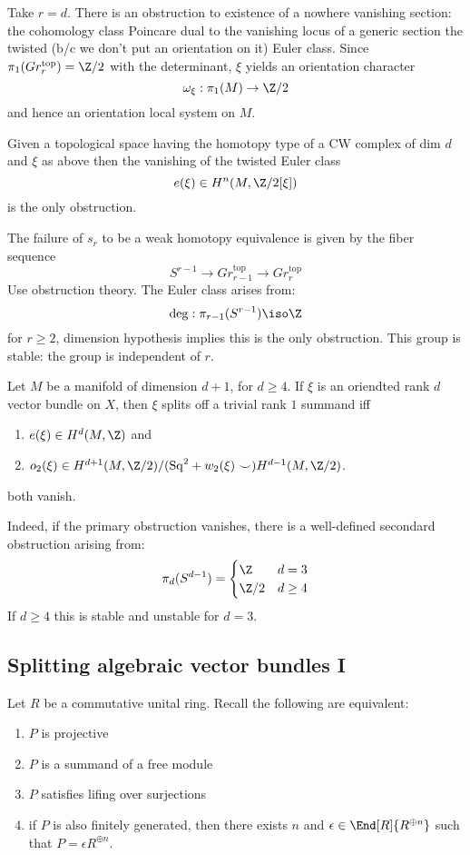 \documentclass{article}
\begin{document}
Take $r = d$. There is an obstruction to existence of a nowhere vanishing section: the cohomology class Poincare dual to the vanishing locus of a generic section the twisted (b/c we don't put an orientation on it) Euler class. Since $\pi_1(Gr_r^{\text{top}}) = \Z / 2$ with the determinant, $\xi$ yields an orientation character
\[ \omega_\xi : \pi_1(M) \to \Z / 2 \]
and hence an orientation local system on $M$.

\begin{theorem}
Given a topological space having the homotopy type of a CW complex of dim $d$ and $\xi$ as above then the vanishing of the twisted Euler class
\[ e(\xi) \in H^n(M, \Z/2[\xi]) \]
is the only obstruction. 
\end{theorem}

The failure of $s_r$ to be a weak homotopy equivalence is given by the fiber sequence
\[ S^{r-1} \to Gr_{r-1}^{\text{top}} \to Gr_{r}^{\text{top}} \] 
Use obstruction theory. The Euler class arises from:
\[ \deg : \pi_{r-1}(S^{r-1}) \iso \Z \]
for $r \ge 2$, dimension hypothesis implies this is the only obstruction. This group is stable: the group is independent of $r$. 

\begin{theorem}
Let $M$ be a manifold of dimension $d+1$, for $d \ge 4$. If $\xi$ is an oriendted rank $d$ vector bundle on $X$, then $\xi$ splits off a trivial rank $1$ summand iff 
\begin{enumerate}
\item $e(\xi) \in H^d(M, \Z)$ and
\item $o_2(\xi) \in H^{d+1}(M, \Z/2) / (\mathrm{Sq}^2 + w_2(\xi) \smile) H^{d-1}(M, \Z / 2)$. 
\end{enumerate}
both vanish.
\end{theorem}
Indeed, if the primary obstruction vanishes, there is a well-defined secondard obstruction arising from:
\[ \pi_d(S^{d-1}) = 
\begin{cases}
\Z & d = 3
\\
\Z / 2 & d \ge 4
\end{cases} \]
If $d \ge 4$ this is stable and unstable for $d = 3$. 

\subsection{Splitting algebraic vector bundles I}

Let $R$ be a commutative unital ring. Recall the following are equivalent:
\begin{enumerate}
\item $P$ is projective
\item $P$ is a summand of a free module
\item $P$ satisfies lifing over surjections
\item if $P$ is also finitely generated, then there exists $n$ and $\epsilon \in \End[R]{R^{\oplus n}}$ such that $P = \epsilon R^{\oplus n}$.
\end{enumerate}
\end{document}
